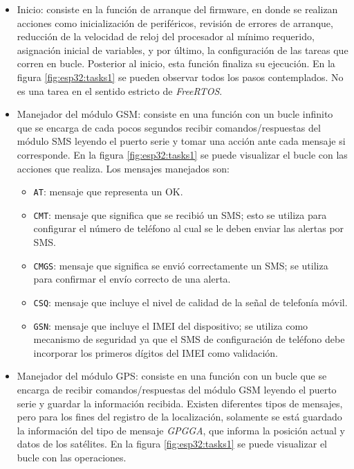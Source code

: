 \begin{itemize}
	\item Inicio: consiste en la función de arranque del firmware, en donde se realizan acciones como inicialización de periféricos, revisión de errores de arranque, reducción de la velocidad de reloj del procesador al mínimo requerido, asignación inicial de variables, y por último, la configuración de las tareas que corren en bucle. Posterior al inicio, esta función finaliza su ejecución. En la figura \ref{fig:esp32:tasks1} se pueden observar todos los pasos contemplados. No es una tarea en el sentido estricto de \textit{FreeRTOS}.
	\item Manejador del módulo GSM: consiste en una función con un bucle infinito que se encarga de cada pocos segundos recibir comandos/respuestas del módulo SMS leyendo el puerto serie y tomar una acción ante cada mensaje si corresponde. En la figura \ref{fig:esp32:tasks1} se puede visualizar el bucle con las acciones que realiza. Los mensajes manejados son:
		\begin{itemize}
			\item \texttt{AT}: mensaje que representa un OK.
			\item \texttt{CMT}: mensaje que significa que se recibió un SMS; esto se utiliza para configurar el número de teléfono al cual se le deben enviar las alertas por SMS.
			\item \texttt{CMGS}: mensaje que significa se envió correctamente un SMS; se utiliza para confirmar el envío correcto de una alerta.
			\item \texttt{CSQ}: mensaje que incluye el nivel de calidad de la señal de telefonía móvil.
			\item \texttt{GSN}: mensaje que incluye el IMEI del dispositivo; se utiliza como mecanismo de seguridad ya que el SMS de configuración de teléfono debe incorporar los primeros dígitos del IMEI como validación.		
		\end{itemize}
		\item Manejador del módulo GPS: consiste en una función con un bucle que se encarga de recibir comandos/respuestas del módulo GSM leyendo el puerto serie y guardar la información recibida. Existen diferentes tipos de mensajes, pero para los fines del registro de la localización, solamente se está guardado la información del tipo de mensaje \textit{GPGGA}, que informa la posición actual y datos de los satélites\citep{NMEA:2}. En la figura \ref{fig:esp32:tasks1} se puede visualizar el bucle con las operaciones.
		\begin{figure}[H]

\end{figure}
\end{itemize}
